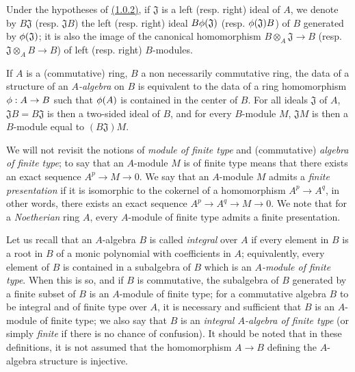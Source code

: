 \begin{env}[1.0.3]
\label{env-0.1.0.3}
Under the hypotheses of \hyperref[env-0.1.0.2]{(1.0.2)}, if $\mathfrak{J}$ is a left
(resp. right) ideal of $A$, we denote by $B\mathfrak{J}$ (resp. $\mathfrak{J}B$)
the left (resp. right) ideal $B\phi(\mathfrak{J})$
(resp. $\phi(\mathfrak{J})B$) of $B$ generated by $\phi(\mathfrak{J})$; it is
also the image of the canonical homomorphism $B\otimes_A\mathfrak{J}\to B$
(resp. $\mathfrak{J}\otimes_A B\to B$) of left (resp. right) $B$-modules.
\end{env}

\begin{env}[1.0.4]
\label{env-0.1.0.4}
If $A$ is a (commutative) ring, $B$ a non necessarily commutative ring, the data
of a structure of an {\em $A$-algebra} on $B$ is equivalent to the data of a
ring homomorphism $\phi:A\to B$ such that $\phi(A)$ is contained in the center
of $B$. For all ideals $\mathfrak{J}$ of $A$, $\mathfrak{J}B=B\mathfrak{J}$ is
then a two-sided ideal of $B$, and for every $B$-module $M$, $\mathfrak{J}M$ is
then a $B$-module equal to $(B\mathfrak{J})M$.
\end{env}

\begin{env}[1.0.5]
\label{env-0.1.0.5}
We will not revisit the notions of {\em module of finite type} and
(commutative) {\em algebra of finite type}; to say that an $A$-module $M$ is of
finite type means that there exists
an exact sequence $A^p\to M\to 0$. We say that an $A$-module $M$ admits a
{\em finite presentation} if it is isomorphic to the cokernel of a homomorphism
$A^p\to A^q$, in other words, there exists an exact sequence
$A^p\to A^q\to M\to 0$. We note that for a {\em Noetherian} ring $A$, every
$A$-module of finite type admits a finite presentation.

Let us recall that an $A$-algebra $B$ is called {\em integral} over $A$ if
every element in $B$ is a root in $B$ of a monic polynomial with coefficients in
$A$; equivalently, every element of $B$ is contained in a subalgebra of $B$
which is an {\em $A$-module of finite type}. When this is so, and if $B$ is
commutative, the subalgebra of $B$ generated by a finite subset of $B$ is an
$A$-module of finite type; for a commutative algebra $B$ to be integral and of
finite type over $A$, it is necessary and sufficient that $B$ is an $A$-module
of finite type; we also say that $B$ is an {\em integral $A$-algebra of finite
type} (or simply {\em finite} if there is no chance of confusion). It should be
noted that in these definitions, it is not assumed that the homomorphism
$A\to B$ defining the $A$-algebra structure is injective.
\end{env}

